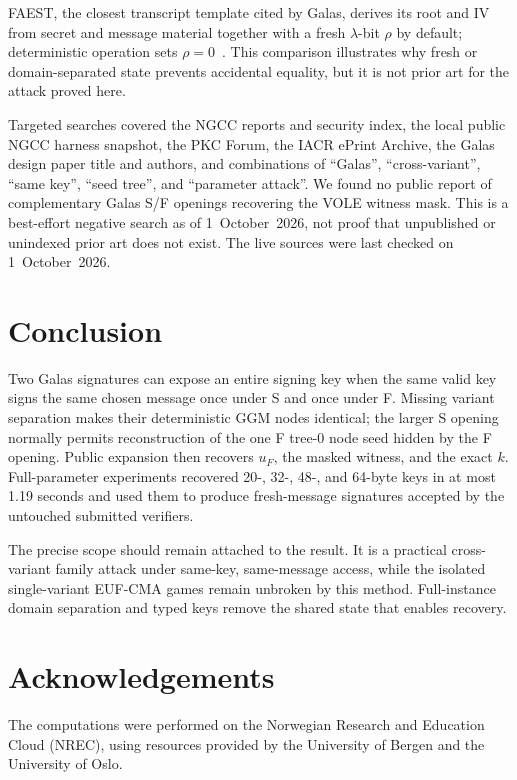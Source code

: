 \documentclass[11pt,a4paper]{article}
\begin{document}
FAEST, the closest transcript template cited by Galas, derives its root and IV
from secret and message material together with a fresh $\lambda$-bit $\rho$ by
default; deterministic operation sets $\rho=0$~\cite{faestv2}.  This comparison
illustrates why fresh or domain-separated state prevents accidental equality, but
it is not prior art for the attack proved here.

Targeted searches covered the NGCC reports and security index, the local public
NGCC harness snapshot, the PKC Forum, the IACR ePrint Archive, the Galas design
paper title and authors, and combinations of ``Galas'', ``cross-variant'',
``same key'', ``seed tree'', and ``parameter attack''.  We found no public report
of complementary Galas S/F openings recovering the VOLE witness mask.  This is a
best-effort negative search as of 1~October~2026, not proof that unpublished or
unindexed prior art does not exist.  The live sources were last checked on
1~October~2026.

\section{Conclusion}

Two Galas signatures can expose an entire signing key when the same valid key
signs the same chosen message once under S and once under F.  Missing variant
separation makes their deterministic GGM nodes identical; the larger S opening
normally permits reconstruction of the one F tree-0 node seed hidden by the F
opening.  Public expansion then recovers $u_F$, the masked witness, and the exact
$k$.  Full-parameter
experiments recovered 20-, 32-, 48-, and 64-byte keys in at most 1.19 seconds and
used them to produce fresh-message signatures accepted by the untouched submitted
verifiers.

The precise scope should remain attached to the result.  It is a practical
cross-variant family attack under same-key, same-message access, while the
isolated single-variant EUF-CMA games remain unbroken by this method.  Full-instance
domain separation and typed keys remove the shared state that enables recovery.

\section*{Acknowledgements}

The computations were performed on the Norwegian Research and Education Cloud
(NREC), using resources provided by the University of Bergen and the University
of Oslo.
\end{document}
